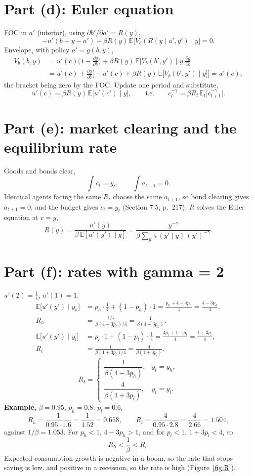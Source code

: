 \documentclass[12pt]{article}
\newcommand{\E}{\mathbb{E}}
\begin{document}
\section*{Part (d): Euler equation}

FOC in $a'$ (interior), using $\partial b'/\partial a'=R(y)$,
\[
  -u'(b+y-a')+\beta R(y)\,\E\big[V_b(R(y)a',y')\mid y\big]=0 .
\]
Envelope, with policy $a'=g(b,y)$,
\begin{align*}
  V_b(b,y)&=u'(c)\Big(1-\frac{\partial g}{\partial b}\Big)
  +\beta R(y)\,\E\big[V_b(b',y')\mid y\big]\frac{\partial g}{\partial b}\\
  &=u'(c)+\frac{\partial g}{\partial b}\Big[-u'(c)+\beta R(y)\,\E\big[V_b(b',y')\mid y\big]\Big]
  =u'(c),
\end{align*}
the bracket being zero by the FOC. Update one period and substitute,
\[
  u'(c)=\beta R(y)\,\E\big[u'(c')\mid y\big],
  \qquad\text{i.e.}\qquad
  c_t^{-\gamma}=\beta R_t\,\E_t\big[c_{t+1}^{-\gamma}\big].
\]

\section*{Part (e): market clearing and the equilibrium rate}

Goods and bonds clear,
\[
  \int c_t=y_t,\qquad \int a_{t+1}=0 .
\]
Identical agents facing the same $R_t$ choose the same $a_{t+1}$, so bond
clearing gives $a_{t+1}=0$, and the budget gives $c_t=y_t$ (Section 7.5,
p.\ 217). $R$ solves the Euler equation at $c=y$,
\[
  R(y)=\frac{u'(y)}{\beta\,\E[u'(y')\mid y]}
  =\frac{y^{-\gamma}}{\beta\sum_{y'}\pi(y'\mid y)\,(y')^{-\gamma}} .
\]

\section*{Part (f): rates with gamma = 2}

$u'(2)=\frac14$, $u'(1)=1$.
\begin{align*}
  \E\big[u'(y')\mid y_h\big]&=p_h\cdot\frac14+(1-p_h)\cdot1=\frac{p_h+4-4p_h}{4}=\frac{4-3p_h}4,\\
  R_h&=\frac{1/4}{\beta(4-3p_h)/4}=\frac1{\beta(4-3p_h)} .\\[2mm]
  \E\big[u'(y')\mid y_l\big]&=p_l\cdot1+(1-p_l)\cdot\frac14=\frac{4p_l+1-p_l}{4}=\frac{1+3p_l}4,\\
  R_l&=\frac{1}{\beta(1+3p_l)/4}=\frac4{\beta(1+3p_l)} .
\end{align*}
\[
  \boxed{\ R_t=\begin{cases}\dfrac1{\beta(4-3p_h)}, & y_t=y_h,\\[3mm]
  \dfrac4{\beta(1+3p_l)}, & y_t=y_l.\end{cases}\ }
\]
\textbf{Example,} $\beta=0.95$, $p_h=0.8$, $p_l=0.6$,
\[
  R_h=\frac1{0.95\cdot1.6}=\frac1{1.52}=0.658,
  \qquad
  R_l=\frac4{0.95\cdot2.8}=\frac4{2.66}=1.504,
\]
against $1/\beta=1.053$. For $p_h<1$, $4-3p_h>1$, and for $p_l<1$,
$1+3p_l<4$, so
\[
  R_h<\frac1\beta<R_l .
\]
Expected consumption growth is negative in a boom, so the rate that stops
saving is low, and positive in a recession, so the rate is high
(Figure~\ref{fig:R}).
\end{document}
